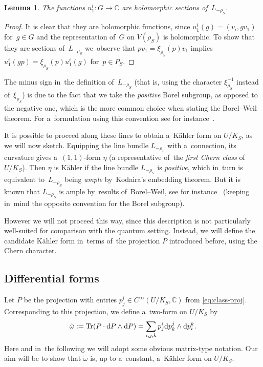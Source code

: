 \documentclass[10pt,a4paper]{amsart}
\numberwithin{equation}{section}
\newtheorem{Lemma}[Theorem]{Lemma}
\newcommand{\diff}{\mathrm{d}}
\newcommand{\bbC}{\mathbb{C}}
\newcommand{\weiS}{\rho_S}
\newcommand{\charS}{\xi_{\weiS}}
\newcommand{\kafot}{\tilde{\omega}}
\begin{document}
\begin{Lemma}
The functions $u^i_1\colon G \to \bbC$ are holomorphic sections of~$L_{-\rho_S}$.
\end{Lemma}

\begin{proof}
It is clear that they are holomorphic functions, since $u^i_1(g) = (v_i, g v_1)$ for~$g \in G$ and the representation of~$G$ on $V(\rho_S)$ is holomorphic.
To show that they are sections of~$L_{-\rho_S}$ we~observe that $p v_1 = \charS(p) v_1$ implies $u^i_1(g p) = \charS(p) u^i_1(g)$ for~$p \in P_S$.
\end{proof}

\begin{Remark}
The minus sign in~the definition of~$L_{-\rho_S}$ (that is, using the character $\charS^{-1}$ instead of~$\charS$) is due to the fact that we take the \emph{positive} Borel subgroup, as opposed to the negative one, which is the more common choice when stating the Borel--Weil theorem.
For a~formulation using this convention see for instance~\cite[Theorem~7.58]{sepanski}.
\end{Remark}

It is possible to proceed along these lines to obtain a~K\"ahler form on $U / K_S$, as we will now sketch.
Equipping the line bundle $L_{-\rho_S}$ with a~connection, its curvature gives a~$(1, 1)$-form $\eta$ (a representative of~the \emph{first Chern class} of~$U / K_S$).
Then $\eta$ is K\"ahler if the line bundle $L_{-\rho_S}$ is \emph{positive}, which in~turn is equivalent to~$L_{-\rho_S}$ being \emph{ample} by~Kodaira's embedding theorem.
But it is known that $L_{-\rho_S}$ is ample by~results of~Borel--Weil, see for instance~\cite[Theorem~6.5]{snow} (keeping in~mind the opposite convention for the Borel subgroup).

However we will not proceed this way, since this description is not particularly well-suited for comparison with the quantum setting.
Instead, we will define the candidate K\"ahler form in~terms of~the projection $P$ introduced before, using the Chern character.

\subsection{Differential forms}

Let $P$ be the projection with entries $p^i_j \in C^\infty(U / K_S, \bbC)$ from \eqref{eq:class-proj}.
Corresponding to this projection, we define a~two-form on $U / K_S$ by
\[
\kafot := \mathop{\rm Tr}(P \cdot \diff P \wedge \diff P) = \sum_{i, j, k} p^i_j \diff p^j_k \wedge \diff p^k_i.
\]
Here and in~the following we will adopt some obvious matrix-type notation.
Our aim will be to show that $\tilde{\omega}$ is, up to a~constant, a~K\"ahler form on $U / K_S$.
\end{document}
